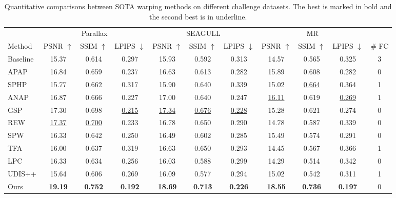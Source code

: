 \documentclass[10pt,twocolumn,letterpaper]{article}
\begin{document}
\begin{table}
	\begin{center}
		\caption{Quantitative comparisons between SOTA warping methods on different challenge datasets. The best is marked in bold and the second best is in underline.} \label{tab:quality}%
		\begin{tabular}{l|ccc|ccc|ccc|c}
			\hline
			& \multicolumn{3}{c|}{Parallax \cite{zhang2014parallax}} & \multicolumn{3}{c|}{SEAGULL \cite{lin2016seagull}} & \multicolumn{3}{c|}{MR \cite{herrmann2018robust}}\\
			Method   & PSNR $\uparrow$ & SSIM $\uparrow$  & LPIPS $\downarrow$ & PSNR $\uparrow$  & SSIM $\uparrow$  & LPIPS $\downarrow$ & PSNR $\uparrow$  & SSIM $\uparrow$  & LPIPS $\downarrow$ & \# FC\\
			\hline
			Baseline & 15.37 & 0.614 & 0.297 & 15.93 & 0.592 & 0.313 & 14.57 & 0.565 & 0.325 & 3\\
			APAP \cite{zaragoza2014projective} & 16.84 & 0.659 & 0.237 & 16.63 & 0.613 & 0.282 & 15.89 & 0.608 & 0.282 & 0 \\
			SPHP \cite{chang2014shape} & 15.77 & 0.662 & 0.317 & 15.90 & 0.640 & 0.339 & 15.02 & \underline{0.664} & 0.364 & 1 \\
			ANAP \cite{lin2015adaptive} & 16.87 & 0.666 & 0.227 & 17.00 & 0.640 & 0.247 & \underline{16.11} & 0.619 & \underline{0.269} & 1 \\
			GSP \cite{chen2016natural} & 17.30 & 0.698 & \underline{0.215} & \underline{17.34} & \underline{0.676} & \underline{0.228} & 15.28 & 0.621 & 0.274 & 0 \\
			REW \cite{li2018parallax} & \underline{17.37} & \underline{0.700} & 0.233 & 16.78 & 0.650 & 0.290 & 14.78 & 0.587 & 0.339 & 0 \\
			SPW \cite{liao2020Single} & 16.33 & 0.642 & 0.250 & 16.49 & 0.602 & 0.285 & 15.49 & 0.574 & 0.291 & 0 \\
			TFA \cite{li2019local} & 16.00 & 0.637 & 0.319 & 16.63 & 0.650 & 0.293 & 14.45 & 0.567 & 0.366 & 1 \\
			LPC \cite{jia2021Leveraging} & 16.33 & 0.634 & 0.256 & 16.03 & 0.588 & 0.299 & 14.29 & 0.514 & 0.342 & 0 \\
			UDIS++ \cite{nie2023parallax} & 15.64 & 0.606 & 0.269 & 16.09 & 0.577 & 0.294 & 15.02 & 0.542 & 0.311 & 1 \\
			Ours  & \textbf{19.19} & \textbf{0.752} & \textbf{0.192} & \textbf{18.69} & \textbf{0.713} & \textbf{0.226} & \textbf{18.55} & \textbf{0.736} & \textbf{0.197} & 0 \\
			\hline
		\end{tabular}%
	\end{center}
\end{table}
\end{document}
